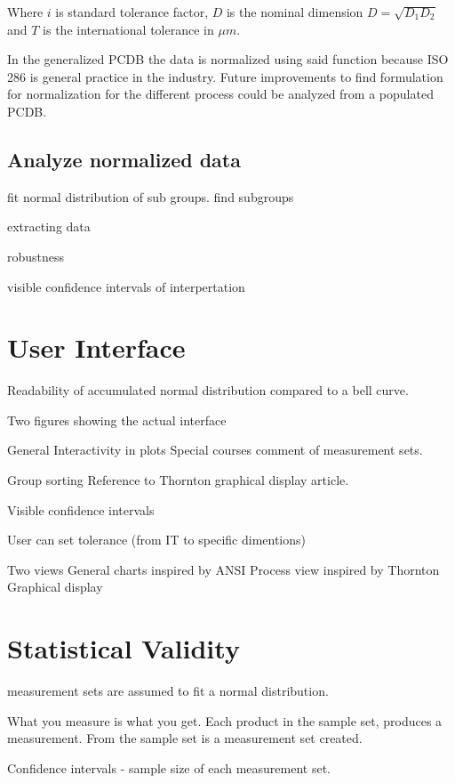 \documentclass[aip,amsmath, reprint, author-year]{revtex4-1}
\begin{document}
Where $i$ is standard tolerance factor, $D$ is the nominal dimension $D = \sqrt{D_1 D_2}$ and $T$ is the international tolerance in $\mu m$.

In the generalized PCDB the data is normalized using said function because ISO 286 is general practice in the industry. Future improvements to find formulation for normalization for the different process could be analyzed from a populated PCDB.

\subsection{Analyze normalized data}



fit normal distribution of sub groups.
find subgroups

extracting data

robustness 



visible confidence intervals of interpertation


\section{User Interface}

Readability of accumulated normal distribution compared to a bell curve.

Two figures showing the actual interface

General
	Interactivity in plots 
		Special courses comment of measurement sets.
	
	Group sorting
		Reference to Thornton graphical display article.

	Visible confidence intervals

	User can set tolerance (from IT to specific dimentions)

Two views
	General charts inspired by ANSI
	Process view inspired by Thornton Graphical display


\section{Statistical Validity}

measurement sets are assumed to fit a normal distribution.

What you measure is what you get.
Each product in the sample set, produces a measurement. From the sample set is a  measurement set created. 

Confidence intervals - sample size of each measurement set.
\end{document}
